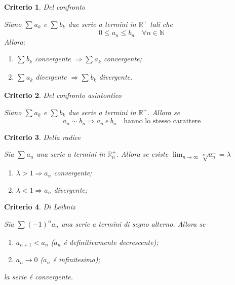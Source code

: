 \documentclass[a4paper, titlepage]{report}%
\theoremstyle{definition} %
\theoremstyle{plain}
\theoremstyle{plain}
\theoremstyle{remark}
\theoremstyle{remark}
\theoremstyle{plain}
\newtheorem*{criterio}{Criterio}
\theoremstyle{plain}
\theoremstyle{plain}
\theoremstyle{plain}
\theoremstyle{plain}
\begin{document}
\begin{criterio}{Del confronto}

    Siano $\sum_{}^{}a_k $ e $\sum_{}^{}b_k $ due serie a termini
    in $\mathbb{R^+}$ tali che
\[
    0 \leq a_n \leq b_n \quad \forall n \in \mathbb{N}    
\]
Allora:
       \begin{enumerate}
    \item $\sum_{}^{}b_k$ convergente $\Longrightarrow \sum_{}^{}a_k $ 
         convergente;
    \item $\sum_{}^{}a_k$ divergente $\Longrightarrow \sum_{}^{}b_k $ 
    divergente.
    
       \end{enumerate} 
\end{criterio}
\begin{criterio}{Del confronto asintontico}

    Siano $\sum_{}^{}a_k $ e $\sum_{}^{}b_k $ due serie a termini
    in $\mathbb{R^+}$. Allora se
\[
      a_n \sim b_n \Longrightarrow a_n \ e \  b_n \quad 
       \text{hanno lo stesso carattere}  
\]
\end{criterio}
\begin{criterio}{Della radice}

    Sia $\sum_{}^{}a_n$ una serie a termini in $\mathbb{R}_0^+$. Allora se esiste
     $\lim_{n \to \infty} \sqrt[n]{a_n} = \lambda$
   \begin{enumerate}
    \item $\lambda > 1 \Longrightarrow a_n $ convergente;
    \item $\lambda < 1 \Longrightarrow a_n $ divergente;
   \end{enumerate}

\end{criterio}
\begin{criterio}{Di Leibniz}

    Sia $\sum_{}^{}(-1)^na_n$ una serie a termini di segno alterno. Allora se
  \begin{enumerate}
    \item $a_{n+1}<a_n$ ($a_n $ \'e definitivamente decrescente);
    \item $a_n \rightarrow 0$ ($a_n$ \'e infinitesima);
  \end{enumerate}
    
  la serie \'e convergente.
\end{criterio}
\end{document}
